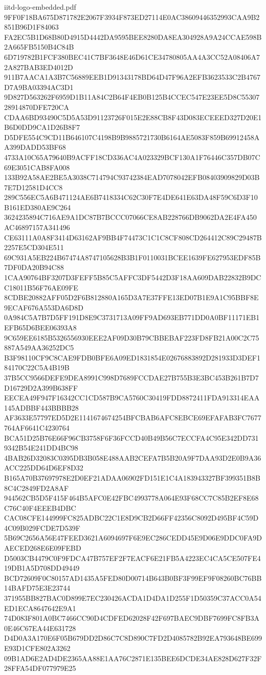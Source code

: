 \begin{filecontents*}[overwrite]{iitd-logo-embedded.pdf}
9FF0F18BA675D871782E2067F3934F873ED27114E0AC38609446352993CAA9B2851B96D1F84063
FA2EC5B1D68B80D4915D4442DA9595BEE8280DA8EA304928A9A24CCAE598B2A665FB5150B4C84B
6D719782B1FCF380BEC41C7BF3648E46D61CE34780805AA4A3CC52A08406A72A827BAB3ED4012D
911B7AACA1A3B7C56889EEB1D91343178BD64D47F96A2EFB3623533C2B4767D7A9BA03394AC3D1
9D827D563262F6959D1B11A84C2B64F4EB0B125B4CCEC547E23EE5D8C5530728914870DFE720CA
CDAA6BD93490C5D5A53D91123726F015E2E88CB8F43D083ECEEED327D20E1B6D0DD9CA1D26B8F7
D5DFE554C9CD11B646107C4198B9B9885721730B6164AE5083F859B69912458AA399DADD53BF68
4733A10C65A79640B9ACFF18CD336AC4A023329BCF130A1F76446C357DB07C69E3051CAB8FA008
133B92A58AE2BE5A3038C714794C93742384EAD7078042EFB08403909829D03B7E7D12581D4CC8
289C556EC5A6B471124AE6B7418334C62C30F7E4DE641E63DA48F59C6D3F10B161ED380AE9C264
3624235894C716AE9A1DC87B7BCCC07066CE8AB228766DB9062DA2E4FA450AC46897157A341496
CE63111A0A8F3414D63162AF9BB4F74473C1C1C8CF808CD264412C89C29487B2257E5CD304E511
69C931A5EB224B67474A8747105628B3B1F0110031BCEE1639FE627953EDF85B7DF0DA20B94C88
1CAA90764BF3207D3FEFF5B85C5AFFC3DF5442D3F18AA609DAB22832B9DCC18011B56F76AE09FE
8CDBE20882AFF05D2F6B812880A165D3A7E37FFE13ED07B1E9A1C95BBF8E9ECAF676A553DA6D8D
0A984C5A7B7D5FF191D8E9C3731713A09FF9AD693EB771DD0A0BF11171EB1EFB65D6BEE06393A8
9C659EE6185B5326556930EEE2AF09D30B79CBBEBAF223FD8FB21A00C2C75887A549AA36252DC5
B3F98110CF9C8CAE9FDB0BFE6A09ED1831854E02676883892D281933D3DEF184170C22C5A4B19B
37B5CC9566DEFE9DEA8991C998D7689FCCDAE27B755B3E3BC453B261B7D7D16729D2A399B638FF
EECEA49F947F16342CC1CD587B9CA5760C30419FDD8872411FDA913314EAA145ADBBF443BBBB28
AF3633E57797ED5D2E1141674674254BFCBAB6AFC8EBCE69EFAFAB3FC7677764AF6641C4230764
BCA51D25B76E66F96CB3758F6F36FCCD40B49B56C7ECCFA4C95E342DD7319342B54E241DD4BC98
4BAB26D32083C0395DB3B058E488AAB2CEFA7B5B20A9F7DAA93D2E0B9A36ACC225DD64D6EF8D32
B165A70B37697978E2D0EF21ADAA06902FD151E1C4A183943327BF399351B8B8C4C2849FD2A8AF
944562CB5D5F415F464B5AFC0E42FBC4993778A064E93F68CC7C85B2EF8E68C76C40F4EEEB4DBC
CAC08CFE144999FC825ADBC22C1E8D9CB2D66FF42356C8092D495BF4C59D4C09B029FCDE7D539F
5B69C2656A56E47FEED3621A6094697F6E9EC286CEDD45E9D06E9DDC0FA9DAECED268E6E09FEBD
D5003CB4479C0F9FDCA47B757EF2F7EACF6E21FB5A4223EC4CA5CE507FE419DB1A5D708DD49449
BCD72609F0C80157AD1435A5FED80D00714B643B0BF3F99EF9F08260BC76BB14BAFD75E3E23744
371955BB827BAC0D899E7EC230426ACDA1D4DA1D255F1D50359C37ACC0A54ED1ECA8647642E9A1
74D083F801A0BC7466CC90D4CDFED62028F42F697BAEC9DBF7699FC8FB3A0E46C67EA44E631728
D4D0A3A170E6F05B679DD2D86C7C8D890C7FD2D4085782B92EA793648BE699E93D1CFE802A3262
09B1AD6E2AD4DE2365AA88E1AA76C2871E135BEE6DCDE34AE828D627F32F28FFA54DF077979E25

\end{filecontents*}

